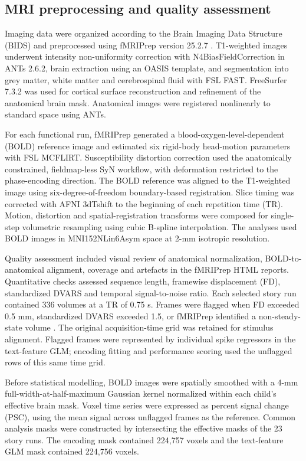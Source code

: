 \subsection{MRI preprocessing and quality assessment}
Imaging data were organized according to the Brain Imaging Data Structure (BIDS) \cite{bids} and preprocessed using fMRIPrep version 25.2.7 \cite{fmriprep}. T1-weighted images underwent intensity non-uniformity correction with N4BiasFieldCorrection in ANTs 2.6.2, brain extraction using an OASIS template, and segmentation into grey matter, white matter and cerebrospinal fluid with FSL FAST. FreeSurfer 7.3.2 was used for cortical surface reconstruction and refinement of the anatomical brain mask. Anatomical images were registered nonlinearly to standard space using ANTs.

For each functional run, fMRIPrep generated a blood-oxygen-level-dependent (BOLD) reference image and estimated six rigid-body head-motion parameters with FSL MCFLIRT. Susceptibility distortion correction used the anatomically constrained, fieldmap-less SyN workflow, with deformation restricted to the phase-encoding direction. The BOLD reference was aligned to the T1-weighted image using six-degree-of-freedom boundary-based registration. Slice timing was corrected with AFNI 3dTshift to the beginning of each repetition time (TR). Motion, distortion and spatial-registration transforms were composed for single-step volumetric resampling using cubic B-spline interpolation. The analyses used BOLD images in MNI152NLin6Asym space at 2-mm isotropic resolution.

Quality assessment included visual review of anatomical normalization, BOLD-to-anatomical alignment, coverage and artefacts in the fMRIPrep HTML reports. Quantitative checks assessed sequence length, framewise displacement (FD), standardized DVARS and temporal signal-to-noise ratio. Each selected story run contained 336 volumes at a TR of 0.75 s. Frames were flagged when FD exceeded 0.5 mm, standardized DVARS exceeded 1.5, or fMRIPrep identified a non-steady-state volume \cite{power}. The original acquisition-time grid was retained for stimulus alignment. Flagged frames were represented by individual spike regressors in the text-feature GLM; encoding fitting and performance scoring used the unflagged rows of this same time grid.

Before statistical modelling, BOLD images were spatially smoothed with a 4-mm full-width-at-half-maximum Gaussian kernel normalized within each child's effective brain mask. Voxel time series were expressed as percent signal change (PSC), using the mean signal across unflagged frames as the reference. Common analysis masks were constructed by intersecting the effective masks of the 23 story runs. The encoding mask contained 224,757 voxels and the text-feature GLM mask contained 224,756 voxels.

